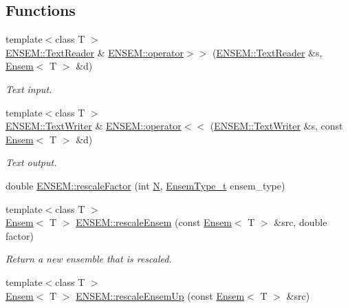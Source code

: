 \subsection*{Functions}
\begin{DoxyCompactItemize}
\item 
{\footnotesize template$<$class T $>$ }\\\mbox{\hyperlink{classENSEM_1_1TextReader}{E\+N\+S\+E\+M\+::\+Text\+Reader}} \& \mbox{\hyperlink{group__eensem_ga607184316d75a7cc8f6e0b082332832e}{E\+N\+S\+E\+M\+::operator$>$$>$}} (\mbox{\hyperlink{classENSEM_1_1TextReader}{E\+N\+S\+E\+M\+::\+Text\+Reader}} \&s, \mbox{\hyperlink{classENSEM_1_1Ensem}{Ensem}}$<$ T $>$ \&d)
\begin{DoxyCompactList}\small\item\em Text input. \end{DoxyCompactList}\item 
{\footnotesize template$<$class T $>$ }\\\mbox{\hyperlink{classENSEM_1_1TextWriter}{E\+N\+S\+E\+M\+::\+Text\+Writer}} \& \mbox{\hyperlink{group__eensem_ga6ec953adfd003a66dd85074b0e1ad399}{E\+N\+S\+E\+M\+::operator$<$$<$}} (\mbox{\hyperlink{classENSEM_1_1TextWriter}{E\+N\+S\+E\+M\+::\+Text\+Writer}} \&s, const \mbox{\hyperlink{classENSEM_1_1Ensem}{Ensem}}$<$ T $>$ \&d)
\begin{DoxyCompactList}\small\item\em Text output. \end{DoxyCompactList}\item 
double \mbox{\hyperlink{group__eensem_ga01418f9a0c64b71fae7f8d400a68f25e}{E\+N\+S\+E\+M\+::rescale\+Factor}} (int \mbox{\hyperlink{operator__name__util_8cc_a7722c8ecbb62d99aee7ce68b1752f337}{N}}, \mbox{\hyperlink{namespaceENSEM_a2dc2c4a26884f343471e52f23479ddbe}{Ensem\+Type\+\_\+t}} ensem\+\_\+type)
\item 
{\footnotesize template$<$class T $>$ }\\\mbox{\hyperlink{classENSEM_1_1Ensem}{Ensem}}$<$ T $>$ \mbox{\hyperlink{group__eensem_gadbb88f64cff72d8d368551b6de6753f9}{E\+N\+S\+E\+M\+::rescale\+Ensem}} (const \mbox{\hyperlink{classENSEM_1_1Ensem}{Ensem}}$<$ T $>$ \&src, double factor)
\begin{DoxyCompactList}\small\item\em Return a new ensemble that is rescaled. \end{DoxyCompactList}\item 
{\footnotesize template$<$class T $>$ }\\\mbox{\hyperlink{classENSEM_1_1Ensem}{Ensem}}$<$ T $>$ \mbox{\hyperlink{group__eensem_ga30c22a7d0685364385ca870e38bd9b3b}{E\+N\+S\+E\+M\+::rescale\+Ensem\+Up}} (const \mbox{\hyperlink{classENSEM_1_1Ensem}{Ensem}}$<$ T $>$ \&src)

\end{DoxyCompactItemize}
